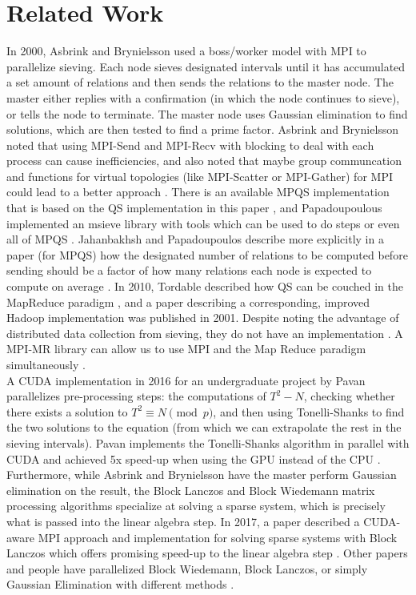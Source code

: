 \documentclass[11pt,twocolumn]{article}
\begin{document}
\section {Related Work}\label{rel}
In 2000, Asbrink and Brynielsson used a boss/worker model with MPI to parallelize sieving. Each node sieves designated intervals until it has accumulated a set amount of relations and then sends the relations to the master node. The master either replies with a confirmation (in which the node continues to sieve), or tells the node to terminate. The master node uses Gaussian elimination to find solutions, which are then tested to find a prime factor. Asbrink and Brynielsson noted that using MPI-Send and MPI-Recv  with blocking to deal with each process can cause inefficiencies, and also noted that maybe group communcation and functions for virtual topologies (like MPI-Scatter or MPI-Gather) for MPI could lead to a better approach \cite{asbrink:parallelqs}. There is an available MPQS implementation that is based on the QS implementation in this paper \cite{bytopia:help}, and Papadoupoulous implemented an msieve library with tools which can be used to do steps or even all of MPQS \cite{papadopoulos:msieve}. Jahanbakhsh and Papadoupoulos describe more explicitly in a paper (for MPQS) how the designated number of relations to be computed before sending should be a factor of how many relations each node is expected to compute on average \cite{jahenbaksh:mpiQS}. In 2010, Tordable described how QS can be couched in the MapReduce paradigm \cite{tordable:intmapreduce}, and a paper describing a corresponding, improved Hadoop implementation was published in 2001. Despite noting the advantage of distributed data collection from sieving, they do not have an implementation \cite{nguyen:hadoop}. A MPI-MR library can allow us to use MPI and the Map Reduce paradigm simultaneously \cite{plimpton:mpimr}. \\
\indent A CUDA implementation in 2016 for an undergraduate project by Pavan parallelizes pre-processing steps: the computations of $T^2 - N$, checking whether there exists a solution to $T^2 \equiv N \pmod{p}$, and then using Tonelli-Shanks to find the two solutions to the equation (from which we can extrapolate the rest in the sieving intervals). Pavan implements the Tonelli-Shanks algorithm in parallel with CUDA and achieved 5x speed-up when using the GPU instead of the CPU \cite{pavan:parallelgpu}.  Furthermore, while Asbrink and Brynielsson have the master perform Gaussian elimination on the result, the Block Lanczos and Block Wiedemann matrix processing algorithms specialize at solving a sparse system, which is precisely what is passed into the linear algebra step. In 2017, a paper described a CUDA-aware MPI approach and implementation for solving sparse systems with Block Lanczos which offers promising speed-up to the linear algebra step \cite{verma:cudampilanczos}. Other papers and people have parallelized Block Wiedemann, Block Lanczos, or simply Gaussian Elimination with different methods \cite{flesch:lanczos} \cite{cohen:gaussian} \cite{wozniak:lanczos}.
\end{document}
